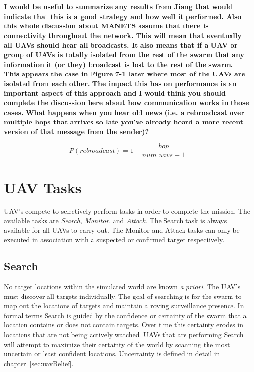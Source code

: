 \textbf{I would be useful to summarize any results from Jiang that would indicate that this is a good strategy and how well it performed. Also this whole discussion about MANETS assume that there is connectivity throughout the network. This will mean that eventually all UAVs should hear all broadcasts. It also means that if a UAV or group of UAVs is totally isolated from the rest of the swarm that any information it (or they) broadcast is lost to the rest of the swarm. This appears the case in Figure 7-1 later where most of the UAVs are isolated from each other. The impact this has on performance is an important aspect of this approach and I would think you should complete the discussion here about how communication works in those cases.	What happens when you hear old news (i.e. a rebroadcast over multiple hops that arrives so late you’ve already heard a more recent version of that message from the sender)?}

\begin{equation}
\label{eq:probFlood}
P(rebroadcast) = 1 - \frac{hop}{num\_uavs - 1}
\end{equation}

\section{UAV Tasks}
UAV's compete to selectively perform tasks in order to complete the mission.  The available tasks are \textit{Search}, \textit{Monitor}, and \textit{Attack}.  The Search task is always available for all UAVs to carry out.  The Monitor and Attack tasks can only be executed in association with a suspected or confirmed target respectively.

\subsection{Search}
No target locations within the simulated world are known \textit{a priori}.  The UAV's must discover all targets individually.  The goal of searching is for the swarm to map out the locations of targets and maintain a roving surveillance presence. In formal terms Search is guided by the confidence or certainty of the swarm that a location contains or does not contain targets.  Over time this certainty erodes in locations that are not being actively watched.  UAVs that are performing Search will attempt to maximize their certainty of the world by scanning the most uncertain or least confident locations.  Uncertainty is defined in detail in chapter~\ref{sec:uavBelief}.

